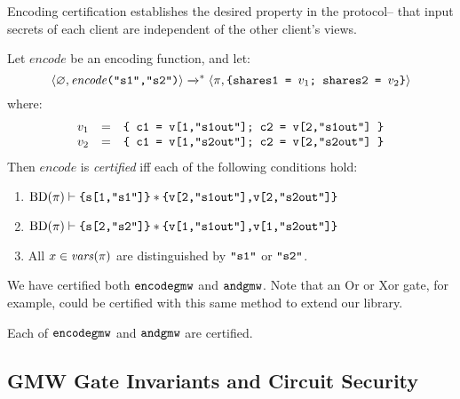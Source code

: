 Encoding certification establishes the desired property in the protocol-- that
input secrets of each client are independent of the other client's views. 
\begin{definition}
  \label{definition-gmwencode-certification}
  Let $\mathit{encode}$ be an encoding function, and let:
  $$
  \langle \varnothing,\mathit{encode}\texttt{("s1","s2")} \rangle \xrightarrow{}^{*}
  \langle \pi,\texttt{\{shares1 = }v_1\texttt{; shares2 = }v_2\texttt{\}} \rangle
  $$
  where:
  $$
  \begin{array}{rcl}
    v_1 &=& \texttt{\{ c1 = v[1,"s1out"]; c2 = v[2,"s1out"] \}}\\
    v_2 &=& \texttt{\{ c1 = v[1,"s2out"]; c2 = v[2,"s2out"] \}}
  \end{array}
  $$
  Then $\mathit{encode}$ is \emph{certified} iff each of the following conditions hold:
  \begin{enumerate}[\hspace{5mm}i.]
  \item $\mathrm{BD}(\pi) \vdash \texttt{\{s[1,"s1"]\}} * \texttt{\{v[2,"s1out"],v[2,"s2out"]\}}$
  \item $\mathrm{BD}(\pi) \vdash \texttt{\{s[2,"s2"]\}} * \texttt{\{v[1,"s1out"],v[1,"s2out"]\}}$
  \item All $x \in \mathit{vars}(\pi)$ are distinguished by $\texttt{"s1"}$ or $\texttt{"s2"}$. 
  \end{enumerate}
  \end{definition}

We have certified both $\texttt{encodegmw}$ and $\texttt{andgmw}$. Note that
an Or or Xor gate, for example, could be certified with this same
method to extend our library.
\begin{lemma}
  \label{lemma-gmw-certification}
  Each of $\texttt{encodegmw}$ and $\texttt{andgmw}$ are certified.
\end{lemma}

\subsection{GMW Gate Invariants and Circuit Security}
\label{section-gmw-composition}

